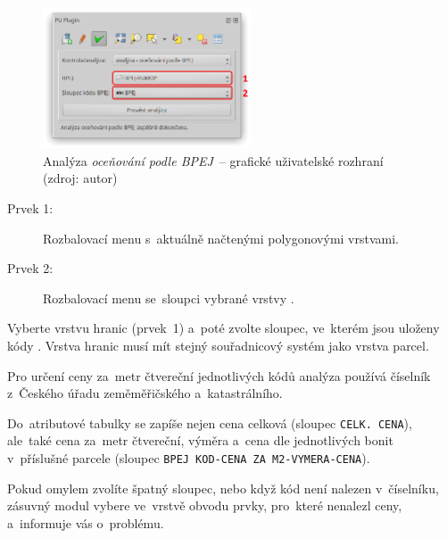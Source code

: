 	\begin{figure}[H] \centering
		\includegraphics[width=0.55\textwidth]{./pictures/analyza_bpej.png}
		\caption[Analýza \textit{oceňování podle BPEJ}~–
grafické uživatelské rozhraní]{Analýza \textit{oceňování podle BPEJ}~–
grafické uživatelské rozhraní (zdroj: autor)}
		\label{fig:manual_analyza_bpej_gui}
 	\end{figure}

\begin{description}
	\item[Prvek 1:] Rozbalovací menu s~aktuálně načtenými
polygonovými vrstvami.
	\item[Prvek 2:] Rozbalovací menu se~sloupci vybrané vrstvy
.
\end{description}

Vyberte vrstvu hranic  (prvek~1) a~poté zvolte sloupec,
ve~kterém jsou uloženy kódy . Vrstva hranic  musí
mít stejný souřadnicový systém jako vrstva parcel.

Pro určení ceny za~metr čtvereční jednotlivých kódů  analýza
používá číselník  z~Českého úřadu zeměměřičského
a~katastrálního.

Do~atributové tabulky se zapíše nejen cena celková (sloupec
\texttt{CELK. CENA}), ale~také cena za~metr čtvereční, výměra a~cena
dle jednotlivých bonit v~příslušné parcele (sloupec \texttt{BPEJ
KOD-CENA ZA M2-VYMERA-CENA}).

Pokud omylem zvolíte špatný slou\-pec, nebo když kód  není
nalezen v~číselníku, zásuvný modul vybere ve~vrstvě obvodu prvky,
pro~které nenalezl ceny, a~informuje vás o~problému.
